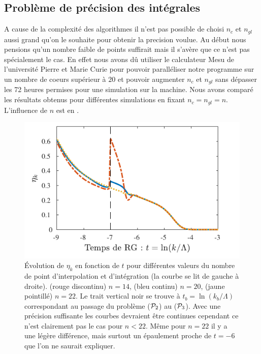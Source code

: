 \documentclass[10.5pt]{article}
\begin{document}
\begin{multicols}{2}
\subsection{Problème de précision des intégrales}


A cause de la complexité des algorithmes il n'est pas possible de choisi $n_c$ et $n_{gl}$ aussi grand qu'on le souhaite pour obtenir la precision voulue. Au début nous pensions qu'un nombre faible de points suffirait mais il s'avère que ce n'est pas spécialement le cas. En effet nous avons dû utiliser le calculateur Mesu \cite{ wiki:xxx} de l'université Pierre et Marie Curie pour pouvoir paralléliser notre programme sur un nombre de coeurs supérieur à $20$ et pouvoir augmenter $n_c$ et $n_{gl}$ sans dépasser les 72 heures permises pour une simulation sur la machine. Nous avons comparé les résultats obtenus pour différentes simulations en fixant $n_c = n_{gl} = n$. L'influence de $n$ est en .

\begin{figure}[H]
\begin{center}
	\includegraphics[width=0.95\columnwidth]{EtakErrMesu.pdf}
\end{center}
\caption{Évolution de $\eta_k$ en fonction de $t$ pour différentes valeurs du nombre de point d'interpolation et d'intégration (la courbe se lit de gauche à droite). (rouge discontinu) $n=14$, (bleu continu) $n=20$, (jaune pointillé) $n=22$. Le trait vertical noir se trouve à $t_b = \ln(k_b/\Lambda)$ correspondant au passage du problème ($\mathcal{P}_2$) au ($\mathcal{P}_3$). Avec une précision suffisante les courbes devraient être continues cependant ce n'est clairement pas le cas pour $n<22$. Même pour $n=22$ il y a une légère différence, mais surtout un épaulement proche de $t=-6$ que l'on ne saurait expliquer.}
\label{fig:etaErr}
\end{figure}


\end{multicols}
\end{document}

